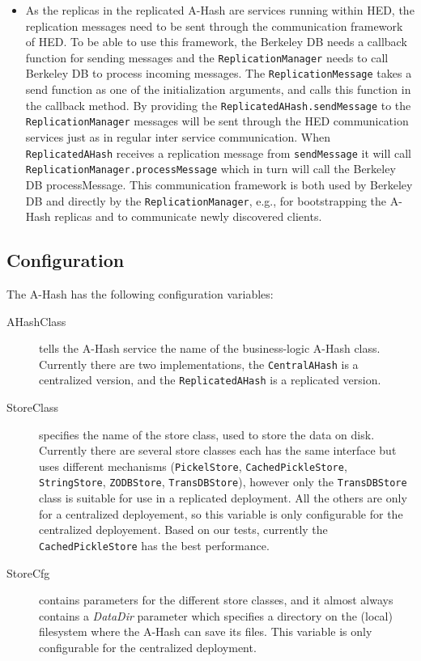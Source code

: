 \documentclass{book}
\begin{document}
\begin{description}
\begin{itemize}
	\item As the replicas in the replicated A-Hash are services running within HED, the replication messages need to be sent through the communication framework of HED. To be able to use this framework, the Berkeley DB needs a callback function for sending messages and the \verb!ReplicationManager! needs to call Berkeley DB to process incoming messages. The \verb!ReplicationMessage! takes a send function as one of the initialization arguments, and calls this function in the callback method. By providing the \verb!ReplicatedAHash.sendMessage! to the \verb!ReplicationManager! messages will be sent through the HED communication services just as in regular inter service communication. When \verb!ReplicatedAHash! receives a replication message from \verb!sendMessage! it will call \verb!ReplicationManager.processMessage! which in turn will call the Berkeley DB processMessage. This communication framework is both used by Berkeley DB and directly by the \verb!ReplicationManager!, e.g., for bootstrapping the A-Hash replicas and to communicate newly discovered clients.
\end{itemize}
\end{description}


\subsection{Configuration} %
\label{sub:a_hash_configuration}


The A-Hash has the following configuration variables:

\begin{description}
    \item[AHashClass] tells the A-Hash service the name of the business-logic A-Hash class. Currently there are two implementations, the \verb!CentralAHash! is a centralized version, and the \verb!ReplicatedAHash! is a replicated version.
    \item[StoreClass] specifies the name of the store class, used to store the data on disk. Currently there are several store classes each has the same interface but uses different mechanisms (\verb!PickelStore!, \verb!CachedPickleStore!, \verb!StringStore!, \verb!ZODBStore!, \verb!TransDBStore!), however only the \verb!TransDBStore! class is suitable for use in a replicated deployment. All the others are only for a centralized deployement, so this variable is only configurable for the centralized deployement. Based on our tests, currently the \verb!CachedPickleStore! has the best performance.
    \item[StoreCfg] contains parameters for the different store classes, and it almost always contains a \emph{DataDir} parameter which specifies a directory on the (local) filesystem where the A-Hash can save its files. This variable is only configurable for the centralized deployment.
\end{description}
\end{document}
